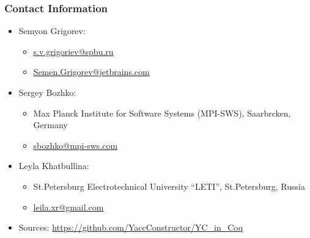 \documentclass[xcolor=table]{beamer}
\begin{document}
\begin{frame}
\frametitle{Contact Information}
\begin{itemize}
  \item Semyon Grigorev:
    \begin{itemize}
      \item \href{mailto:s.v.grigoriev@spbu.ru}{s.v.grigoriev@spbu.ru}
      \item \href{mailto:Semen.Grigorev@jetbrains.com}{Semen.Grigorev@jetbrains.com}
    \end{itemize}
  \item Sergey Bozhko:
  \begin{itemize}
    \item  Max Planck Institute for Software Systems (MPI-SWS), Saarbrcken, Germany
    \item  \href{mailto:sbozhko@mpi-sws.com}{sbozhko@mpi-sws.com}
  \end{itemize}
    \item Leyla Khatbullina:
  \begin{itemize}
    \item St.Petersburg Electrotechnical University ``LETI'', St.Petersburg, Russia
    \item  \href{mailto:leila.xr@gmail.com}{leila.xr@gmail.com}
  \end{itemize}
  \item Sources: \href{https://github.com/YaccConstructor/YC_in_Coq}{https://github.com/YaccConstructor/YC\_in\_Coq}
\end{itemize}
\vspace{2cm}
\end{frame}
\end{document}
